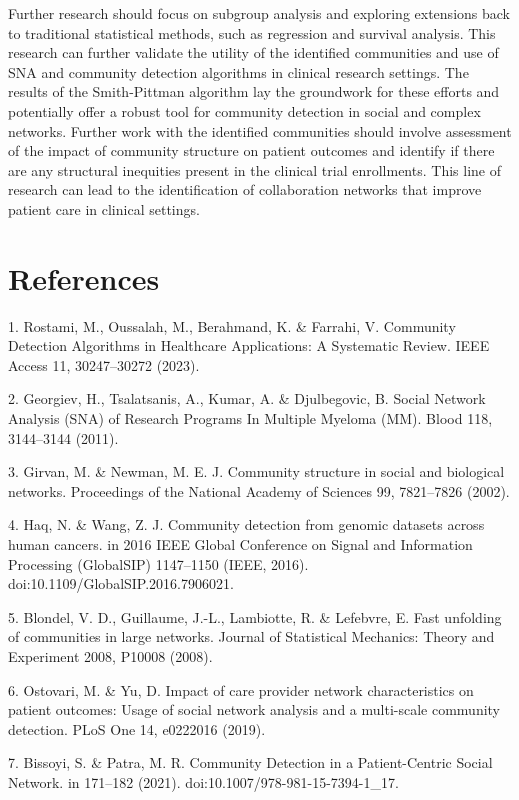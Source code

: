 \documentclass{article}
\begin{document}
Further research should focus on subgroup analysis and exploring
extensions back to traditional statistical methods, such as regression
and survival analysis. This research can further validate the utility of
the identified communities and use of SNA and community detection
algorithms in clinical research settings. The results of the
Smith-Pittman algorithm lay the groundwork for these efforts and
potentially offer a robust tool for community detection in social and
complex networks. Further work with the identified communities should
involve assessment of the impact of community structure on patient
outcomes and identify if there are any structural inequities present in
the clinical trial enrollments. This line of research can lead to the
identification of collaboration networks that improve patient care in
clinical settings.

\newpage
\section{References}\label{references}

1. Rostami, M., Oussalah, M., Berahmand, K. \& Farrahi, V. Community
Detection Algorithms in Healthcare Applications: A Systematic Review.
IEEE Access 11, 30247--30272 (2023).

2. Georgiev, H., Tsalatsanis, A., Kumar, A. \& Djulbegovic, B. Social
Network Analysis (SNA) of Research Programs In Multiple Myeloma (MM).
Blood 118, 3144--3144 (2011).

3. Girvan, M. \& Newman, M. E. J. Community structure in social and
biological networks. Proceedings of the National Academy of Sciences 99,
7821--7826 (2002).

4. Haq, N. \& Wang, Z. J. Community detection from genomic datasets
across human cancers. in 2016 IEEE Global Conference on Signal and
Information Processing (GlobalSIP) 1147--1150 (IEEE, 2016).
doi:10.1109/GlobalSIP.2016.7906021.

5. Blondel, V. D., Guillaume, J.-L., Lambiotte, R. \& Lefebvre, E. Fast
unfolding of communities in large networks. Journal of Statistical
Mechanics: Theory and Experiment 2008, P10008 (2008).

6. Ostovari, M. \& Yu, D. Impact of care provider network
characteristics on patient outcomes: Usage of social network analysis
and a multi-scale community detection. PLoS One 14, e0222016 (2019).

7. Bissoyi, S. \& Patra, M. R. Community Detection in a Patient-Centric
Social Network. in 171--182 (2021). doi:10.1007/978-981-15-7394-1\_17.
\end{document}
